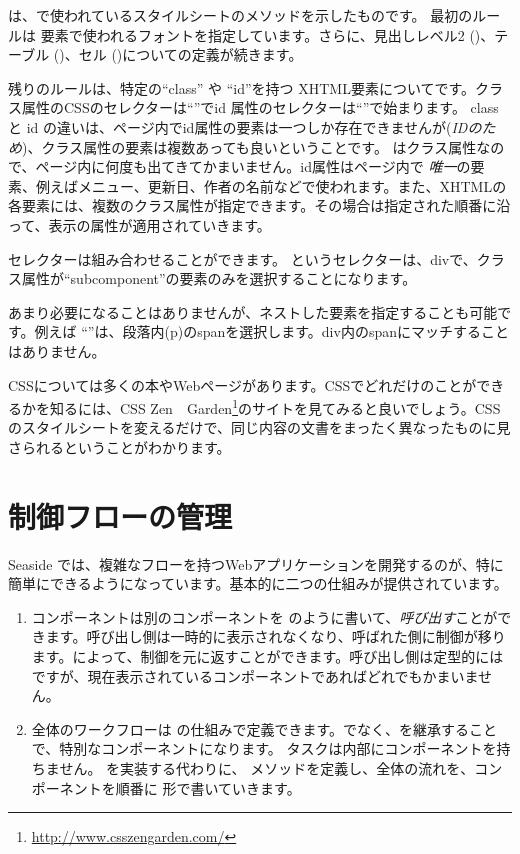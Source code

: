 \documentclass[a4paper,10pt,twoside]{book}
\begin{document}
 は、で使われているスタイルシートのメソッドを示したものです。
最初のルールは 要素で使われるフォントを指定しています。さらに、見出しレベル2 ()、テーブル ()、セル ()についての定義が続きます。


残りのルールは、特定の``class'' や ``id''を持つ XHTML要素についてです。クラス属性のCSSのセレクターは``''でid 属性のセレクターは``\ct{#}''で始まります。
classと id の違いは、ページ内でid属性の要素は一つしか存在できませんが(\emph{IDのため})、クラス属性の要素は複数あっても良いということです。 はクラス属性なので、ページ内に何度も出てきてかまいません。id属性はページ内で \emph{唯一}の要素、例えばメニュー、更新日、作者の名前などで使われます。また、XHTMLの各要素には、複数のクラス属性が指定できます。その場合は指定された順番に沿って、表示の属性が適用されていきます。


セレクターは組み合わせることができます。  というセレクターは、divで、クラス属性が``subcomponent''の要素のみを選択することになります。

あまり必要になることはありませんが、ネストした要素を指定することも可能です。例えば ``''は、段落内(p)のspanを選択します。div内のspanにマッチすることはありません。

CSSについては多くの本やWebページがあります。CSSでどれだけのことができるかを知るには、CSS Zen　Garden\footnote{\url{http://www.csszengarden.com/}}のサイトを見てみると良いでしょう。CSSのスタイルシートを変えるだけで、同じ内容の文書をまったく異なったものに見さられるということがわかります。

\section{制御フローの管理}

Seaside では、複雑なフローを持つWebアプリケーションを開発するのが、特に簡単にできるようになっています。基本的に二つの仕組みが提供されています。

\begin{enumerate}
  \item コンポーネントは別のコンポーネントを のように書いて、\emph{呼び出す}ことができます。呼び出し側は一時的に表示されなくなり、呼ばれた側に制御が移ります。によって、制御を元に返すことができます。呼び出し側は定型的には ですが、現在表示されているコンポーネントであればどれでもかまいません。

  \item 全体のワークフローは の仕組みで定義できます。でなく、を継承することで、特別なコンポーネントになります。  タスクは内部にコンポーネントを持ちません。
   を実装する代わりに、  メソッドを定義し、全体の流れを、コンポーネントを順番に 形で書いていきます。
  
\end{enumerate}
\end{document}
